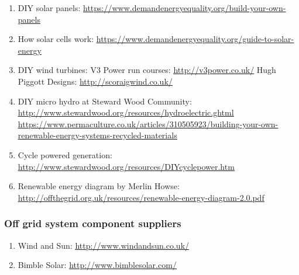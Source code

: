 \documentclass{article}
\theoremstyle{definition}
\theoremstyle{definition}
\theoremstyle{remark}
\begin{document}
    \begin{enumerate}[resume]
      \item DIY solar panels: \href{https://www.demandenergyequality.org/build-your-own-panels}{\underline{https://www.demandenergyequality.org/build-your-own-panels}}
      \item How solar cells work: \href{https://www.demandenergyequality.org/guide-to-solar-energy}{\underline{https://www.demandenergyequality.org/guide-to-solar-energy}}
      \item DIY wind turbines: \newline
      V3 Power run courses: \href{http://v3power.co.uk/}{\underline{http://v3power.co.uk/}} \newline
      Hugh Piggott Designs: \href{http://scoraigwind.co.uk/}{\underline{http://scoraigwind.co.uk/}}
      \item DIY micro hydro at Steward Wood Community: \newline
      \href{http://www.stewardwood.org/resources/hydroelectric.ghtml}{\underline{http://www.stewardwood.org/resources/hydroelectric.ghtml}} \newline
      \href{https://www.permaculture.co.uk/articles/310505923/building-your-own-renewable-energy-systems-recycled-materials}{\underline{https://www.permaculture.co.uk/articles/310505923/building-your-own-renewable-energy-systems-recycled-materials}}
      \item Cycle powered generation: \href{http://www.stewardwood.org/resources/DIYcyclepower.htm}{\underline{http://www.stewardwood.org/resources/DIYcyclepower.htm}}
      \item Renewable energy diagram by Merlin Howse: \newline
      \href{http://offthegrid.org.uk/resources/renewable-energy-diagram-2.0.pdf}{\underline{http://offthegrid.org.uk/resources/renewable-energy-diagram-2.0.pdf}}
    \end{enumerate}



  \subsubsection{Off grid system component suppliers} %
  \label{ssub:off_grid_system_component_suppliers}

    \begin{enumerate}[resume]
      \item Wind and Sun: \href{http://www.windandsun.co.uk/}{\underline{http://www.windandsun.co.uk/}}
      \item Bimble Solar: \href{http://www.bimblesolar.com/}{\underline{http://www.bimblesolar.com/}}
    \end{enumerate}
  
\end{document}
